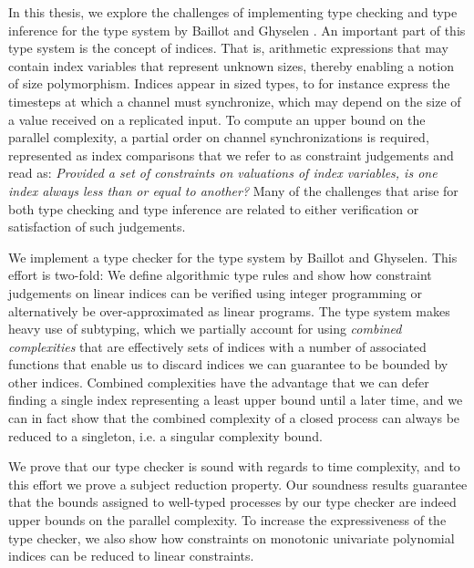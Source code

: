 In this thesis, we explore the challenges of implementing type checking and type inference for the type system by Baillot and Ghyselen \cite{BaillotGhyselen2021}. An important part of this type system is the concept of indices. That is, arithmetic expressions that may contain index variables that represent unknown sizes, thereby enabling a notion of size polymorphism. Indices appear in sized types, to for instance express the timesteps at which a channel must synchronize, which may depend on the size of a value received on a replicated input. To compute an upper bound on the parallel complexity, a partial order on channel synchronizations is required, represented as index comparisons that we refer to as constraint judgements and read as: \textit{Provided a set of constraints on valuations of index variables, is one index always less than or equal to another?} Many of the challenges that arise for both type checking and type inference are related to either verification or satisfaction of such judgements.%

We implement a type checker for the type system by Baillot and Ghyselen. This effort is two-fold: We define algorithmic type rules and show how constraint judgements on linear indices can be verified using integer programming or alternatively be over-approximated as linear programs. The type system makes heavy use of subtyping, which we partially account for using \textit{combined complexities} that are effectively sets of indices with a number of associated functions that enable us to discard indices we can guarantee to be bounded by other indices. Combined complexities have the advantage that we can defer finding a single index representing a least upper bound until a later time, and we can in fact show that the combined complexity of a closed process can always be reduced to a singleton, i.e. a singular complexity bound.

We prove that our type checker is sound with regards to time complexity, and to this effort we prove a subject reduction property. Our soundness results guarantee that the bounds assigned to well-typed processes by our type checker are indeed upper bounds on the parallel complexity. To increase the expressiveness of the type checker, we also show how constraints on monotonic univariate polynomial indices can be reduced to linear constraints.

